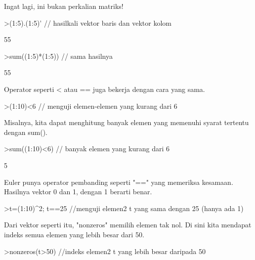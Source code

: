\documentclass[a4paper,10pt]{article}
\begin{document}
\begin{eulernotebook}
\begin{eulercomment}
\begin{eulercomment}
\begin{eulercomment}
\begin{eulercomment}
\begin{eulercomment}
\begin{eulercomment}
\begin{eulercomment}
\begin{eulercomment}
\begin{eulercomment}
\begin{eulercomment}
\begin{eulercomment}
\begin{eulercomment}
\begin{eulercomment}
Ingat lagi, ini bukan perkalian matriks!
\end{eulercomment}
\begin{eulerprompt}
>(1:5).(1:5)' // hasilkali vektor baris dan vektor kolom
\end{eulerprompt}
\begin{euleroutput}
  55
\end{euleroutput}
\begin{eulerprompt}
>sum((1:5)*(1:5)) // sama hasilnya
\end{eulerprompt}
\begin{euleroutput}
  55
\end{euleroutput}
\begin{eulercomment}
Operator seperti \textless{} atau == juga bekerja dengan cara yang sama.
\end{eulercomment}
\begin{eulerprompt}
>(1:10)<6 // menguji elemen-elemen yang kurang dari 6
\end{eulerprompt}
\begin{euleroutput}
  [1,  1,  1,  1,  1,  0,  0,  0,  0,  0]
\end{euleroutput}
\begin{eulercomment}
Misalnya, kita dapat menghitung banyak elemen yang memenuhi syarat tertentu
dengan sum().
\end{eulercomment}
\begin{eulerprompt}
>sum((1:10)<6) // banyak elemen yang kurang dari 6
\end{eulerprompt}
\begin{euleroutput}
  5
\end{euleroutput}
\begin{eulercomment}
Euler punya operator pembanding seperti "==" yang memeriksa kesamaan.
Hasilnya vektor 0 dan 1, dengan 1 berarti benar.
\end{eulercomment}
\begin{eulerprompt}
>t=(1:10)^2; t==25 //menguji elemen2 t yang sama dengan 25 (hanya ada 1)
\end{eulerprompt}
\begin{euleroutput}
  [0,  0,  0,  0,  1,  0,  0,  0,  0,  0]
\end{euleroutput}
\begin{eulercomment}
Dari vektor seperti itu, "nonzeros" memilih elemen tak nol. Di sini kita
mendapat indeks semua elemen yang lebih besar dari 50.
\end{eulercomment}
\begin{eulerprompt}
>nonzeros(t>50) //indeks elemen2 t yang lebih besar daripada 50

\end{eulerprompt}
\end{eulercomment}
\end{eulercomment}
\end{eulercomment}
\end{eulercomment}
\end{eulercomment}
\end{eulercomment}
\end{eulercomment}
\end{eulercomment}
\end{eulercomment}
\end{eulercomment}
\end{eulercomment}
\end{eulercomment}
\end{eulernotebook}
\end{document}
